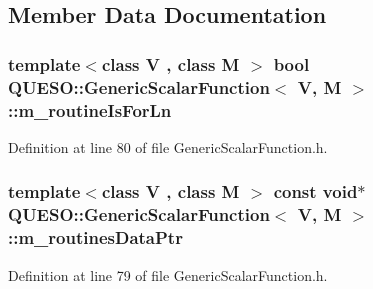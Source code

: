 \subsection{Member Data Documentation}
\hypertarget{class_q_u_e_s_o_1_1_generic_scalar_function_a22e044d791d578453734356587bd7e65}{
\subsubsection[{m\-\_\-routine\-Is\-For\-Ln}]{\setlength{\rightskip}{0pt plus 5cm}template$<$class V , class M $>$ bool {\bf Q\-U\-E\-S\-O\-::\-Generic\-Scalar\-Function}$<$ V, M $>$\-::m\-\_\-routine\-Is\-For\-Ln\hspace{0.3cm}{\ttfamily [protected]}}}\label{class_q_u_e_s_o_1_1_generic_scalar_function_a22e044d791d578453734356587bd7e65}


Definition at line 80 of file Generic\-Scalar\-Function.\-h.

\hypertarget{class_q_u_e_s_o_1_1_generic_scalar_function_a46b2964caebcd2e22f913f86798bdf36}{
\subsubsection[{m\-\_\-routines\-Data\-Ptr}]{\setlength{\rightskip}{0pt plus 5cm}template$<$class V , class M $>$ const void$\ast$ {\bf Q\-U\-E\-S\-O\-::\-Generic\-Scalar\-Function}$<$ V, M $>$\-::m\-\_\-routines\-Data\-Ptr\hspace{0.3cm}{\ttfamily [protected]}}}\label{class_q_u_e_s_o_1_1_generic_scalar_function_a46b2964caebcd2e22f913f86798bdf36}


Definition at line 79 of file Generic\-Scalar\-Function.\-h.

